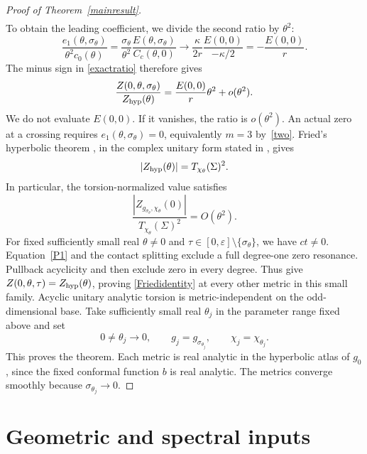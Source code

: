\documentclass[11pt,letterpaper,reqno]{amsart}
\theoremstyle{remark}
\begin{document}
\begin{proof}[Proof of Theorem~\ref{mainresult}]
\begin{equation}
\begin{aligned}
 \end{aligned}
\end{equation}
To obtain the leading coefficient, we divide the second ratio by $\theta^2$:
\[
 \frac{e_1(\theta,\sigma_\theta)}{\theta^2c_0(\theta)}
 =\frac{\sigma_\theta}{\theta^2}
   \frac{E(\theta,\sigma_\theta)}{C_c(\theta,0)}
 \longrightarrow\frac\kappa{2r}\frac{E(0,0)}{-\kappa/2}
 =-\frac{E(0,0)}r.
\]
The minus sign in \eqref{exactratio} therefore gives
\begin{equation}\label{quantitativeratio}
 \frac{Z(0,\theta,\sigma_\theta)}{Z_{\rm hyp}(\theta)}
 =\frac{E(0,0)}{r}\theta^2+o(\theta^2).
\end{equation}
We do not evaluate $E(0,0)$. If it vanishes, the ratio is
$o(\theta^2)$. An actual zero at a crossing requires
$e_1(\theta,\sigma_\theta)=0$, equivalently $m=3$ by~\eqref{two}.
Fried's hyperbolic theorem \cite{Fried}, in the complex unitary
form stated in \cite[Theorem 3]{DGRS}, gives
\[
 |Z_{\rm hyp}(\theta)|=T_{\chi_\theta}(\Sigma)^2.
\]
In particular, the torsion-normalized value satisfies
\begin{equation}\label{quantitativebound}
 \frac{|Z_{g_{\sigma_\theta},\chi_\theta}(0)|}
      {T_{\chi_\theta}(\Sigma)^2}=O(\theta^2).
\end{equation}
For fixed sufficiently small real $\theta\ne0$ and
$\tau\in[0,\varepsilon]\setminus\{\sigma_\theta\}$, we have $ct\ne0$.
Equation~\eqref{P1} and the contact splitting exclude a full degree-one
zero resonance. Pullback acyclicity and \cite[Proposition~7.3]{DGRS}
then exclude zero in every degree. Thus \cite[Theorem~9 and (6.8)]{CD}
give $Z(0,\theta,\tau)=Z_{\rm hyp}(\theta)$, proving
\eqref{Friedidentity} at every other metric in this small family.
Acyclic unitary analytic torsion is metric-independent on the
odd-dimensional base. Take sufficiently small real $\theta_j$ in the
parameter range fixed above and set
\[
 0\ne\theta_j\longrightarrow0,\qquad
 g_j=g_{\sigma_{\theta_j}},\qquad\chi_j=\chi_{\theta_j}.
\]
This proves the theorem. Each metric is real analytic in the hyperbolic atlas of $g_0$,
since the fixed conformal function $b$ is real analytic.
The metrics converge smoothly because
$\sigma_{\theta_j}\to0$.
\end{proof}

\appendix
\section{Geometric and spectral inputs}\label{app:inputs}
\end{document}
